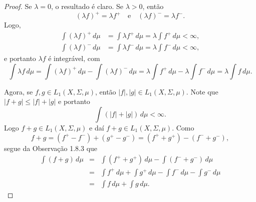 \begin{proof}
    Se $\lambda = 0$, o resultado é claro. Se $\lambda > 0$, então
    \[
    (\lambda f)^+ = \lambda f^+ \quad \text{e} \quad (\lambda f)^- = \lambda f^-.
    \]
    Logo,
    \[
    \begin{aligned}
        \int (\lambda f)^+ \, d\mu &= \int \lambda f^+ \, d\mu = \lambda \int f^+ \, d\mu < \infty, \\
        \int (\lambda f)^- \, d\mu &= \int \lambda f^- \, d\mu = \lambda \int f^- \, d\mu < \infty,
    \end{aligned}
    \]
    e portanto $\lambda f$ é integrável, com
    \[
    \int \lambda f \, d\mu = \int (\lambda f)^+ \, d\mu - \int (\lambda f)^- \, d\mu = \lambda \int f^+ \, d\mu - \lambda \int f^- \, d\mu = \lambda \int f \, d\mu.
    \]

    Agora, se $f, g \in L_1(X, \Sigma, \mu)$, então $|f|, |g| \in L_1(X, \Sigma, \mu)$. Note que $|f + g| \leq |f| + |g|$ e portanto
    \[
    \int (|f| + |g|) \, d\mu < \infty.
    \]
    Logo $f + g \in L_1(X, \Sigma, \mu)$ e daí $f + g \in L_1(X, \Sigma, \mu)$. Como
    \[
    f + g = (f^+ - f^-) + (g^+ - g^-) = (f^+ + g^+) - (f^- + g^-),
    \]
    segue da Observação 1.8.3 que
    \begin{eqnarray*}
        \int (f + g) \, d\mu &=& \int (f^+ + g^+) \, d\mu - \int (f^- + g^-) \, d\mu\\
        &=& \int f^+ \, d\mu + \int g^+ \, d\mu - \int f^- \, d\mu - \int g^- \, d\mu \\
        &=& \int f \, d\mu + \int g \, d\mu.
    \end{eqnarray*}
    
\end{proof}

